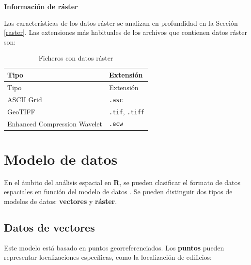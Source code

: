 \documentclass[
]{book}
\theoremstyle{definition}
\theoremstyle{definition}
\theoremstyle{definition}
\theoremstyle{definition}
\theoremstyle{remark}
\begin{document}
\textbf{Información de ráster}

Las características de los datos ráster se analizan en profundidad en la Sección
\ref{raster}. Las extensiones más habituales de los archivos que contienen
datos ráster son:

\begin{longtable}[]{@{}ll@{}}
\caption{Ficheros con datos ráster}\tabularnewline
\toprule
Tipo & Extensión \\
\midrule
\endfirsthead
\toprule
Tipo & Extensión \\
\midrule
\endhead
ASCII Grid & \texttt{.asc} \\
GeoTIFF & \texttt{.tif}, \texttt{.tiff} \\
Enhanced Compression Wavelet & \texttt{.ecw} \\
\bottomrule
\end{longtable}

\hypertarget{modelo-de-datos}{%
\section{Modelo de datos}\label{modelo-de-datos}}

En el ámbito del análisis espacial en \textbf{R}, se pueden clasificar el formato de
datos espaciales en función del modelo de datos \citep{Lovelance_et_al_2019}. Se
pueden distinguir dos tipos de modelos de datos: \textbf{vectores} y \textbf{ráster}.

\hypertarget{vec}{%
\subsection{Datos de vectores}\label{vec}}

Este modelo está basado en puntos georreferenciados. Los \textbf{puntos} pueden
representar localizaciones específicas, como la localización de edificios:
\end{document}

